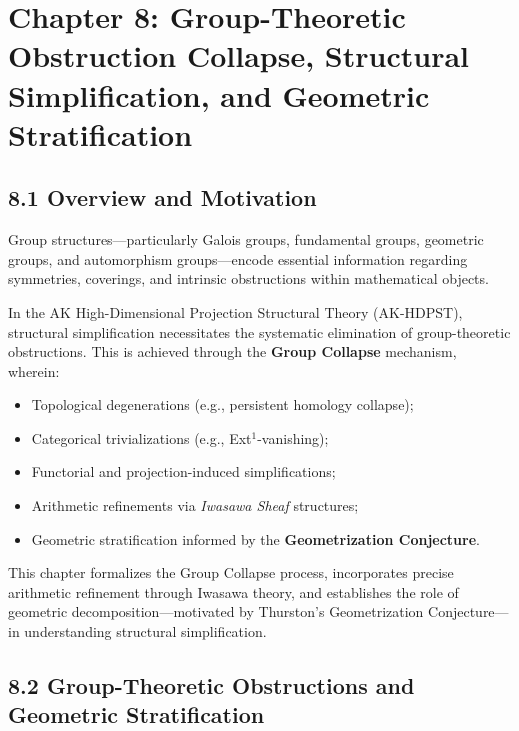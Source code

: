 \documentclass[11pt]{article}
\begin{document}
\section{Chapter 8: Group-Theoretic Obstruction Collapse, Structural Simplification, and Geometric Stratification}

\subsection*{8.1 Overview and Motivation}

Group structures—particularly Galois groups, fundamental groups, geometric groups, and automorphism groups—encode essential information regarding symmetries, coverings, and intrinsic obstructions within mathematical objects.

In the AK High-Dimensional Projection Structural Theory (AK-HDPST), structural simplification necessitates the systematic elimination of group-theoretic obstructions. This is achieved through the \textbf{Group Collapse} mechanism, wherein:

\begin{itemize}
    \item Topological degenerations (e.g., persistent homology collapse);
    \item Categorical trivializations (e.g., Ext$^1$-vanishing);
    \item Functorial and projection-induced simplifications;
    \item Arithmetic refinements via \emph{Iwasawa Sheaf} structures;
    \item Geometric stratification informed by the \textbf{Geometrization Conjecture}.
\end{itemize}

This chapter formalizes the Group Collapse process, incorporates precise arithmetic refinement through Iwasawa theory, and establishes the role of geometric decomposition—motivated by Thurston's Geometrization Conjecture—in understanding structural simplification.

\subsection*{8.2 Group-Theoretic Obstructions and Geometric Stratification}
\end{document}
